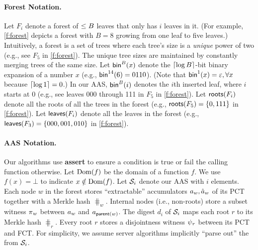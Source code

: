 \paragraph{Forest Notation.}
\label{s:prelim:notation:forests}
Let $F_i$ denote a forest of $\le B$ leaves that only has $i$ leaves in it.
(For example, \cref{f:forest} depicts a forest with $B=8$ growing from one leaf to five leaves.)
Intuitively, a forest is a set of trees where each tree's size is a \textit{unique} power of two (e.g., see $F_5$ in \cref{f:forest}).
The unique tree sizes are maintained by constantly merging trees of the same size.
Let $\mathsf{bin}^B(x)$ denote the $\lceil\log{\ensuremath{B}}\rceil$-bit binary expansion of a number $x$ (e.g., $\mathsf{bin}^{14}(6)=0110$).
(Note that $\mathsf{bin}^1(x) = \varepsilon,\forall x$ because $\lceil\log{1}\rceil=0$.)
In our AAS, $\mathsf{bin}^B(i)$ denotes the $i$th inserted leaf, where $i$ starts at 0 (e.g., see leaves 000 through 111 in $F_5$ in \cref{f:forest}).
Let $\mathsf{roots}(F_i)$ denote all the roots of all the trees in the forest (e.g., $\mathsf{roots}(F_5) = \{0, 111\}$ in \cref{f:forest}).
Let $\mathsf{leaves}(F_i)$ denote all the leaves in the forest (e.g., $\mathsf{leaves}(F_3) = \{000, 001, 010\}$ in \cref{f:forest}).

\paragraph{AAS Notation.}
Our algorithms use \textbf{assert} to ensure a condition is true or fail the calling function otherwise. 
Let $\operatorname{Dom}(f)$ be the domain of a function $f$. %
We use $f(x)=\bot$ to indicate $x\notin \operatorname{Dom}(f)$.
Let $\mathcal{S}_i$ denote our AAS with $i$ elements.
Each node $w$ in the forest stores ``extractable'' accumulators $\textcolor{black}{a}_w, \textcolor{black}{\hat{a}}_w$ of its PCT together with a Merkle hash $\hash_w$.
Internal nodes (i.e., non-roots) store a subset witness $\textcolor{black}{\pi}_w$ between $\textcolor{black}{a}_w$ and $\textcolor{black}{a}_{\mathsf{parent}(w)}$.
The digest $d_i$ of $\mathcal{S}_i$ maps each root $r$ to its Merkle hash $\hash_r$.
Every root $r$ stores a disjointness witness $\textcolor{black}{\psi}_r$ between its PCT and FCT.
For simplicity, we assume server algorithms implicitly ``parse out'' the  from $\mathcal{S}_i$.

